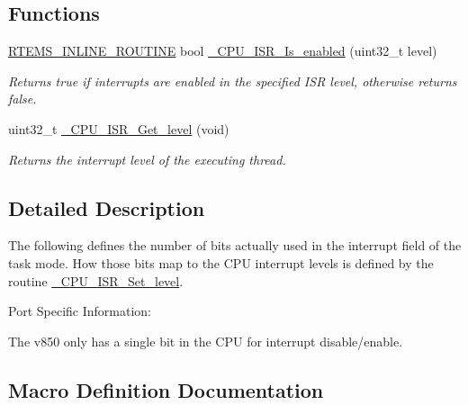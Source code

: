 \subsection*{Functions}
\begin{DoxyCompactItemize}
\item 
\mbox{\hyperlink{group__RTEMSScoreBaseDefs_gac216239df231d5dbd15e3520b0b9313f}{R\+T\+E\+M\+S\+\_\+\+I\+N\+L\+I\+N\+E\+\_\+\+R\+O\+U\+T\+I\+NE}} bool \mbox{\hyperlink{group__RTEMSScoreCPUV850CPUInterrupt_ga5254669b54a06e96ebb585fd50a02c4d}{\+\_\+\+C\+P\+U\+\_\+\+I\+S\+R\+\_\+\+Is\+\_\+enabled}} (uint32\+\_\+t level)
\begin{DoxyCompactList}\small\item\em Returns true if interrupts are enabled in the specified I\+SR level, otherwise returns false. \end{DoxyCompactList}\item 
uint32\+\_\+t \mbox{\hyperlink{group__RTEMSScoreCPUV850CPUInterrupt_ga1d9dcab9170d532b6634a5620385adbd}{\+\_\+\+C\+P\+U\+\_\+\+I\+S\+R\+\_\+\+Get\+\_\+level}} (void)
\begin{DoxyCompactList}\small\item\em Returns the interrupt level of the executing thread. \end{DoxyCompactList}\end{DoxyCompactItemize}


\subsection{Detailed Description}
The following defines the number of bits actually used in the interrupt field of the task mode. How those bits map to the C\+PU interrupt levels is defined by the routine \mbox{\hyperlink{group__RTEMSScoreCPUARM_ga43820ba3d51d7a699c22fce8cac93ef1}{\+\_\+\+C\+P\+U\+\_\+\+I\+S\+R\+\_\+\+Set\+\_\+level}}.

Port Specific Information\+:

The v850 only has a single bit in the C\+PU for interrupt disable/enable. 

\subsection{Macro Definition Documentation}
\mbox{\label{group__RTEMSScoreCPUV850CPUInterrupt_gaca3fde6f372ee51fdd893c260e7d7146}} 

